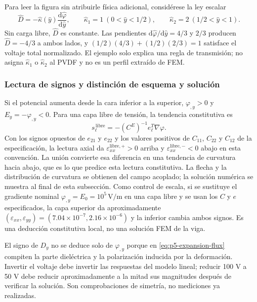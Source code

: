 Para leer la figura sin atribuirle física adicional, considérese la ley
escalar
\begin{equation}
  \hat D=-\hat\kappa(\hat y)\frac{\mathrm d\hat\varphi}{\mathrm d\hat y},
  \qquad
  \hat\kappa_1=1\ (0<\hat y<1/2),\qquad
  \hat\kappa_2=2\ (1/2<\hat y<1).
  \label{eq:p5-expansion-didactic-interface}
\end{equation}
Sin carga libre, $\hat D$ es constante. Las pendientes
$\mathrm d\hat\varphi/\mathrm d\hat y=4/3$ y $2/3$ producen
$\hat D=-4/3$ a ambos lados, y
$(1/2)(4/3)+(1/2)(2/3)=1$ satisface el voltaje total normalizado. El ejemplo
solo explica una regla de transmisión; no asigna $\hat\kappa_1$ o
$\hat\kappa_2$ al PVDF y no es un perfil extraído de FEM.

\subsubsection{Lectura de signos y distinción de esquema y solución}

Si el potencial aumenta desde la cara inferior a la superior,
$\varphi_{,y}>0$ y $E_y=-\varphi_{,y}<0$. Para una capa libre de tensión,
la tendencia constitutiva es
\begin{equation}
  s_\ell^{\,\mathrm{libre}}=-(C^E)^{-1}e_\ell^T\nabla\varphi.
  \label{eq:p5-expansion-free-strain}
\end{equation}
Con los signos opuestos de $e_{21}$ y $e_{22}$ y los valores positivos de
$C_{11}$, $C_{22}$ y $C_{12}$ de la especificación, la lectura axial da
$\varepsilon_{xx}^{\mathrm{libre},+}>0$ arriba y
$\varepsilon_{xx}^{\mathrm{libre},-}<0$ abajo en esta convención. La unión
convierte esa diferencia en una tendencia de curvatura hacia abajo, que es lo
que predice esta lectura constitutiva. La flecha y la distribución de curvatura se obtienen del campo acoplado; la solución numérica se muestra al final de esta subsección.
Como control de escala, si se sustituye el gradiente nominal
$\varphi_{,y}=E_0=10^5\,\mathrm{V}/\mathrm{m}$ en una capa libre y se usan
los $C$ y $e$ especificados, la capa superior da aproximadamente
$(\varepsilon_{xx},\varepsilon_{yy})=(7.04\times10^{-7},
2.16\times10^{-6})$ y la inferior cambia ambos signos. Es una deducción
constitutiva local, no una solución FEM de la viga.

El signo de $D_y$ no se deduce solo de $\varphi_{,y}$ porque en
\eqref{eq:p5-expansion-flux} compiten la parte dieléctrica y la polarización
inducida por la deformación. Invertir el voltaje debe invertir las respuestas
del modelo lineal; reducir 100 V a 50 V debe reducir aproximadamente a la
mitad sus magnitudes después de verificar la solución. Son comprobaciones de
simetría, no mediciones ya realizadas.


